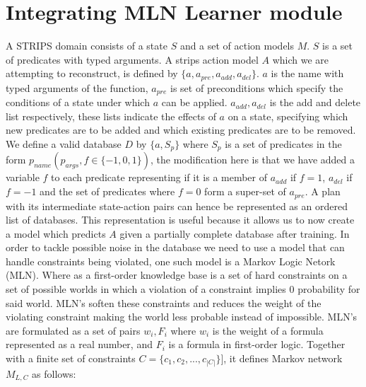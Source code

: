 \section{Integrating MLN Learner module}
A STRIPS domain consists of a state \(S\) and a set of action models \(M\).
\(S\) is a set of predicates with typed arguments.
A strips action model \(A\) which we are attempting to reconstruct, is defined by  \(\{a,a_{pre},a_{add},a_{del}\}\). \(a\) is the name with typed arguments of the function, \(a_{pre}\) is set of preconditions which specify the conditions of a state under which \(a\) can be applied. \(a_{add}, a_{del}\) is the add and delete list respectively, these lists indicate the effects of \(a\) on a state, specifying which new predicates are to be added and which existing predicates are to be removed.
\newline \newline
We define a valid database \(D\) by \(\{a,S_{p}\}\) where \(S_p\)  is a set of predicates in the form \(p_{name}(p_{args},f\in \{-1,0,1\})\), the modification here is that we have added a variable \(f\) to each predicate representing if it is a member of \(a_{add}\) if \(f=1\), \(a_{del}\) if \(f=-1\) and the set of predicates where \(f=0\) form a super-set of \(a_{pre}\).
\newline \newline
A plan with its intermediate state-action pairs can hence be represented as an ordered list of databases. This representation is useful because it allows us to now create a model which predicts \(A\) given a partially complete database after training.
\newline \newline
In order to tackle possible noise in the database we need to use a model that can handle constraints being violated, one such model is a Markov Logic Netork (MLN). Where as a first-order knowledge base is a set of hard constraints on a set of possible worlds in which a violation of a constraint implies 0 probability for said world. MLN's soften these constraints and reduces the weight of the violating constraint making the world less probable instead of impossible. MLN's are formulated as a set of pairs \(w_i,F_i\) where \(w_i\) is the weight of a formula represented as a real number, and \(F_i\) is a formula in first-order logic. Together with a finite set of constraints \(C = \{c_1,c_2,...,c_{|C|}\}]\), it defines Markov network \(M_{L,C}\) as follows:
